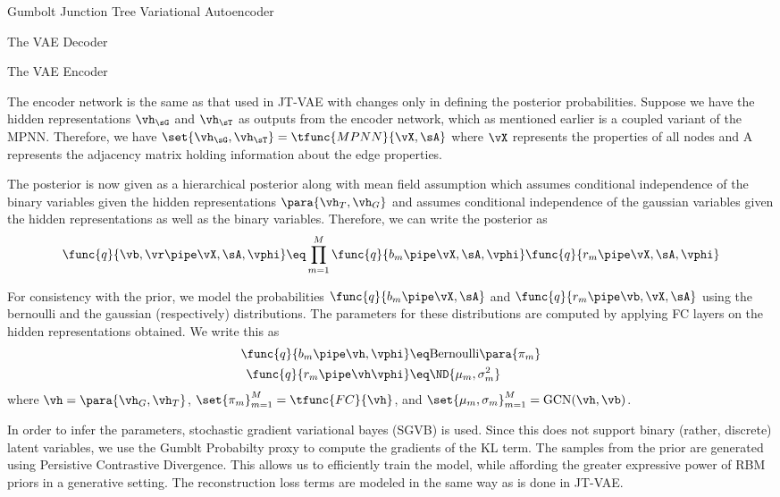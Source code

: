 \documentclass{article}
\begin{document}
\begin{psection}{Gumbolt Junction Tree Variational Autoencoder}
\begin{psubsection}{The VAE Decoder}
	\end{psubsection}

	\begin{psubsection}{The VAE Encoder}

		The encoder network is the same as that used in JT-VAE with changes only in defining the posterior probabilities. Suppose we have the hidden representations $\vh_\sG$ and $\vh_\sT$ as outputs from the encoder network, which as mentioned earlier is a coupled variant of the MPNN. Therefore, we have $\set{\vh_\sG, \vh_\sT} = \tfunc{MPNN}{\vX, \sA}$ where $\vX$ represents the properties of all nodes and A represents the adjacency matrix holding information about the edge properties.

		The posterior is now given as a hierarchical posterior along with mean field assumption which assumes conditional independence of the binary variables given the hidden representations $\para{\vh_T, \vh_G}$ and assumes conditional independence of the gaussian variables given the hidden representations as well as the binary variables. Therefore, we can write the posterior as
		\begin{align}
			\func{q}{\vb, \vr \pipe \vX, \sA, \vphi} \eq \prod_{m = 1}^M \func{q}{b_m \pipe \vX, \sA, \vphi} \func{q}{r_m \pipe \vX, \sA, \vphi}
			\label{eq:posterior}
		\end{align}

		For consistency with the prior, we model the probabilities $\func{q}{b_m \pipe \vX, \sA}$ and $\func{q}{r_m \pipe \vb, \vX, \sA}$ using the bernoulli and the gaussian (respectively) distributions. The parameters for these distributions are computed by applying FC layers on the hidden representations obtained. We write this as
		\begin{align*}
			\func{q}{b_m \pipe \vh, \vphi} &\eq \text{Bernoulli}\para{\pi_m} \\
			\func{q}{r_m \pipe \vh \vphi} &\eq \ND{\mu_m, \sigma_m^2}
		\end{align*}
		where $\vh = \para{\vh_G, \vh_T}$, $\set{\pi_m}_{m = 1}^M = \tfunc{FC}{\vh}$, and $\set{\mu_m, \sigma_m}_{m = 1}^M = \text{GCN}(\vh, \vb)$.

		In order to infer the parameters, stochastic gradient variational bayes (SGVB) is used. Since this does not support binary (rather, discrete) latent variables, we use the Gumblt Probabilty proxy to compute the gradients of the KL term. The samples from the prior are generated using Persistive Contrastive Divergence. This allows us to efficiently train the model, while affording the greater expressive power of RBM priors in a generative setting. The reconstruction loss terms are modeled in the same way as is done in JT-VAE.

	\end{psubsection}

\end{psection}
\end{document}
